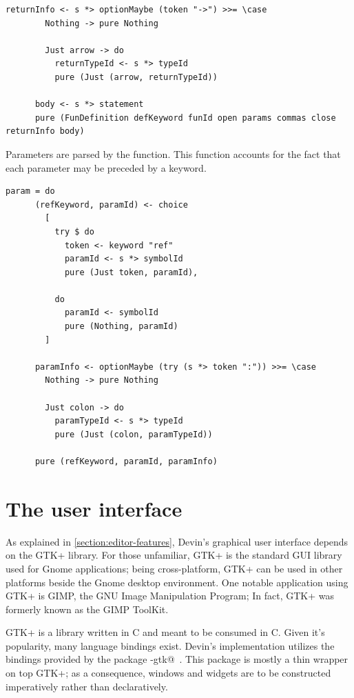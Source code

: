 \documentclass[UdineBachThesis,american,11pt]{PhdThesis}
\begin{document}
  \newpage

  \begin{lstlisting}[gobble=4,basicstyle=\ttfamily\small]
      returnInfo <- s *> optionMaybe (token "->") >>= \case
        Nothing -> pure Nothing

        Just arrow -> do
          returnTypeId <- s *> typeId
          pure (Just (arrow, returnTypeId))

      body <- s *> statement
      pure (FunDefinition defKeyword funId open params commas close returnInfo body)
  \end{lstlisting}

  Parameters are parsed by the \lstinline@param@ function. This function
  accounts for the fact that each parameter may be preceded by a \lstinline@ref@
  keyword.

  \begin{lstlisting}[gobble=4,basicstyle=\ttfamily\small]
    param = do
      (refKeyword, paramId) <- choice
        [
          try $ do
            token <- keyword "ref"
            paramId <- s *> symbolId
            pure (Just token, paramId),

          do
            paramId <- symbolId
            pure (Nothing, paramId)
        ]

      paramInfo <- optionMaybe (try (s *> token ":")) >>= \case
        Nothing -> pure Nothing

        Just colon -> do
          paramTypeId <- s *> typeId
          pure (Just (colon, paramTypeId))

      pure (refKeyword, paramId, paramInfo)
  \end{lstlisting}

  \section{The user interface}

  As explained in \autoref{section:editor-features}, Devin's graphical user
  interface depends on the GTK+ library. For those unfamiliar, GTK+ is the
  standard GUI library used for Gnome applications; being cross-platform, GTK+
  can be used in other platforms beside the Gnome desktop environment. One
  notable application using GTK+ is GIMP, the GNU Image Manipulation Program; In
  fact, GTK+ was formerly known as the GIMP ToolKit.

  GTK+ is a library written in C and meant to be consumed in C. Given it's
  popularity, many language bindings exist. Devin's implementation utilizes the
  bindings provided by the package \lstinline@gi-gtk@~\cite{gi-gtk}. This
  package is mostly a thin wrapper on top GTK+; as a consequence, windows and
  widgets are to be constructed imperatively rather than declaratively.
\end{document}
